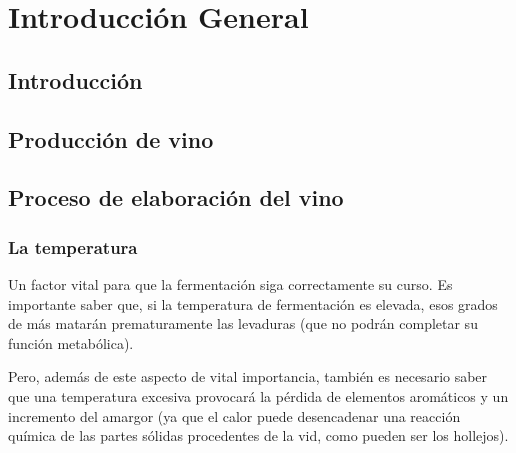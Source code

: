 
\chapter{Introducción General} %

\label{Chapter1} %
\label{IntroGeneral}


\newcommand{\keyword}[1]{\textbf{#1}}
\newcommand{\tabhead}[1]{\textbf{#1}}
\newcommand{\code}[1]{\texttt{#1}}
\newcommand{\file}[1]{\texttt{\bfseries#1}}
\newcommand{\option}[1]{\texttt{\itshape#1}}
\newcommand{\grados}{$^{\circ}$}


\section{Introducción}


\section{Producción de vino}
\section{Proceso de elaboración del vino}

\subsection{La temperatura}

  Un factor vital para que la fermentación siga correctamente su curso. Es importante saber que, si la temperatura de fermentación es elevada, esos grados de más matarán prematuramente las levaduras (que no podrán completar su función metabólica).

  Pero, además de este aspecto de vital importancia, también es necesario saber que una temperatura excesiva provocará la pérdida de elementos aromáticos y un incremento del amargor (ya que el calor puede desencadenar una reacción química de las partes sólidas procedentes de la vid, como pueden ser los hollejos).

